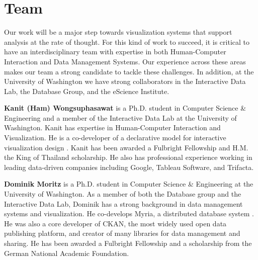 \section*{Team}

Our work will be a major step towards visualization systems that support analysis at the rate of thought.  For this kind of work to succeed, it is critical to have an interdisciplinary team with expertise in both Human-Computer Interaction and Data Management Systems. Our experience across these areas makes our team a strong candidate to tackle these challenges.  In addition, at the University of Washington we have strong collaborators in the Interactive Data Lab, the Database Group, and the eScience Institute.

\textbf{Kanit (Ham) Wongsuphasawat} is a Ph.D. student in Computer Science \& Engineering and a member of the Interactive Data Lab at the University of Washington.  Kanit has expertise in Human-Computer Interaction and Visualization.  He is a co-developer of a declarative model for interactive visualization design \cite{satyanarayan:reactive-vega}.  Kanit has been awarded a Fulbright Fellowship and H.M. the King of Thailand scholarship.  He also has professional experience working in leading data-driven companies including Google, Tableau Software, and Trifacta.

\textbf{Dominik Moritz} is a Ph.D. student in Computer Science \& Engineering at the University of Washington.   As a member of both the Database group and the Interactive Data Lab, Dominik has a strong background in data management systems and visualization.  He co-develops Myria, a distributed database system \cite{halperin:myria}.
He was also a core developer of CKAN, the most widely used open data publishing platform,
and creator of many libraries for data management and sharing.
He has been awarded a Fulbright Fellowship and a scholarship from the German National Academic Foundation.